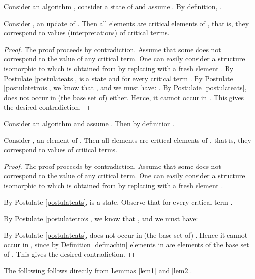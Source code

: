 \documentclass[envcountsame]{llncs}
\begin{document}
\begin{lemma} \label{lem1}
Consider an algorithm , consider a state  of  and assume
. By definition,  .

Consider ,
  an update of .  Then all elements 
  are critical elements of , that is, they correspond to values
  (interpretations) of critical terms.
\end{lemma}



\begin{proof}
The proof proceeds by contradiction. Assume that some  does not correspond to the
value of any critical term.  One can easily consider a structure  isomorphic to  which is obtained from  by
replacing  with a fresh element .
By Postulate
\ref{postulateats},  is a state and  for every
 critical term .
By Postulate \ref{postulatetrois}, we know that
, and we must have:
.
By Postulate \ref{postulateats},
 does not occur in  (the base set of)   either. Hence, it cannot occur in
. This gives the desired
contradiction.
\end{proof}



\begin{lemma} \label{lem2}
Consider an algorithm  and assume . Then by definition
.

Consider ,
an element of .  Then all elements 
are critical elements of , that is, they correspond  to values of critical terms.
\end{lemma}

\begin{proof}
The proof proceeds by contradiction. Assume that some  does not correspond to the
value of any critical term.  One can easily consider a structure  isomorphic to  which is obtained from  by
replacing  with a fresh element .

By Postulate
\ref{postulateats},  is a state. Observe that  for every
 critical term .

By Postulate \ref{postulatetrois}, we know that
, and we must have:

By Postulate \ref{postulateats},
 does not occur in  (the base set of)  . Hence it cannot occur in
, since by Definition \ref{defmachin} elements in  are
elements of the base set of . This gives the desired
contradiction.
\end{proof}





The following follows directly from Lemmas \ref{lem1} and \ref{lem2}.
\end{document}
